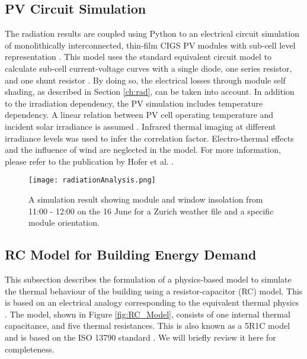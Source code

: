 \subsection{PV Circuit Simulation}

The radiation results are coupled using Python to an electrical circuit simulation of monolithically interconnected, thin-film CIGS PV modules with sub-cell level representation \cite{hofer2016parametric,python}. This model uses the standard equivalent circuit model to calculate sub-cell current-voltage curves with a single diode, one series resistor, and one shunt resistor \cite{mermoud2010}. By doing so, the electrical losses through module self shading, as described in Section \ref{ch:rad}, can be taken into account. In addition to the irradiation dependency, the PV simulation includes temperature dependency. A linear relation between PV cell operating temperature and incident solar irradiance is assumed \cite{skoplaki2009operating}. Infrared thermal imaging at different irradiance levels was used to infer the correlation factor. Electro-thermal effects and the influence of wind are neglected in the model. For more information, please refer to the publication by Hofer et al. \cite{hofer2016parametric}.


\begin{figure}
\begin{center}
\texttt{[image: radiationAnalysis.png]}
\caption{A simulation result showing module and window insolation from 11:00 - 12:00 on the 16 June for a Zurich weather file and a specific module orientation.}
\label{fig:radiation2}
\end{center}
\end{figure}


\subsection{RC Model for Building Energy Demand}

This subsection describes the formulation of a physics-based model to simulate the thermal behaviour of the building using a resistor-capacitor (RC) model. This is based on an electrical analogy corresponding to the equivalent thermal physics \cite{bacher2011identifying, sonderegger2010diagnostic, madsen1995estimation}. The model, shown in Figure \ref{fig:RC_Model}, consists of one internal thermal capacitance, and five thermal resistances. This is also known as a 5R1C model and is based on the ISO 13790 standard \cite{de2008iso}. We will briefly review it here for completeness.

